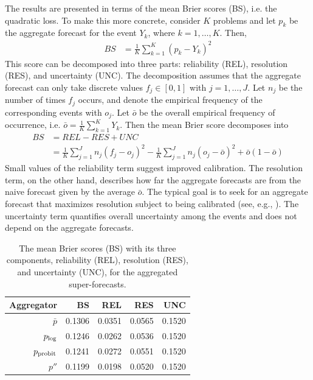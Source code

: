 \documentclass[11pt]{article}
\theoremstyle{definition}
\theoremstyle{definition}
\def\probit{p_{\rm probit}}
\def\plog{p_{\rm log}}
\begin{document}
 
The results are presented in terms of the mean Brier scores (BS), i.e. the quadratic loss. To make this more concrete, consider $K$ problems and let $p_k$ be the aggregate forecast for the event $Y_k$, where $k = 1, \dots, K$. Then,
 \begin{align*}
BS &= \frac{1}{K} \sum_{k=1}^K (p_k - Y_k)^2
 \end{align*}
 This score can be decomposed into three parts: reliability (REL), resolution (RES), and uncertainty (UNC). The decomposition assumes that the aggregate forecast can only take discrete values $f_j \in [0,1]$ with $j = 1, \dots, J$. Let $n_j$ be the number of times $f_j$ occurs, and denote the empirical frequency of the corresponding events with $o_j$.  Let $\bar{o}$ be the overall empirical frequency of occurrence, i.e. $\bar{o} = \frac{1}{K} \sum_{k=1}^K Y_k$. Then the mean Brier score decomposes into 
 \begin{align*}
BS &= REL - RES + UNC\\
&= \frac{1}{K} \sum_{j=1}^J n_j (f_j - o_j)^2 - \frac{1}{K} \sum_{j=1}^J n_j (o_j - \bar{o})^2 + \bar{o}(1-\bar{o})
 \end{align*}
 Small values of the reliability term suggest improved calibration. The resolution term, on the other hand, describes how far the aggregate forecasts are from the naive forecast given by the average $\bar{o}$. The typical goal is to seek for an aggregate forecast that maximizes resolution subject to being calibrated (see, e.g., \citealt{gneiting2007probabilistic}). The uncertainty term quantifies overall uncertainty among the events and does not depend on the aggregate forecasts. 
 
\begin{table}[t]
\centering
\begin{tabular}{rrrrr}
  \hline
Aggregator & BS & REL & RES & UNC \\ 
  \hline
$\bar{p}$ & 0.1306 & 0.0351 & 0.0565 & 0.1520 \\ 
 $\plog$ & 0.1246 & 0.0262 & 0.0536 & 0.1520 \\ 
 $\probit$ & 0.1241 & 0.0272 & 0.0551 & 0.1520 \\ 
 $p''$ & 0.1199 & 0.0198 & 0.0520 & 0.1520 \\ 
   \hline
\end{tabular}
\caption{The mean Brier scores (BS) with its three components, reliability (REL), resolution (RES), and uncertainty (UNC), for the aggregated super-forecasts.}
\label{BrierTable}
\end{table}
\end{document}
